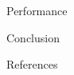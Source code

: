 \documentclass[unknownkeysallowed,final]{beamer}
\begin{document}
\begin{frame}{}
\begin{textblock}{17.3}
\begin{block}{\small{Performance}}
\end{block}
%
\begin{block}{\small{Conclusion}}
\end{block}
%
\begin{block}{\small{References}}


\end{block}
\end{textblock}

\end{frame}
\end{document}
